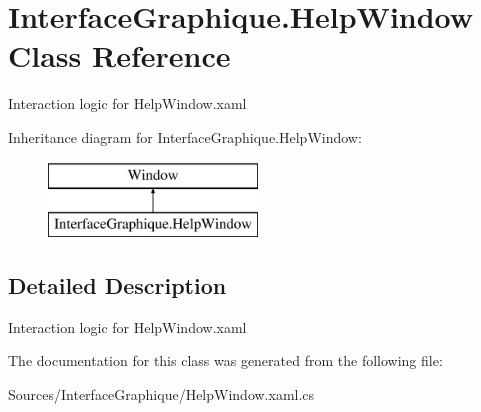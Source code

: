 \hypertarget{class_interface_graphique_1_1_help_window}{}\section{Interface\+Graphique.\+Help\+Window Class Reference}
\label{class_interface_graphique_1_1_help_window}


Interaction logic for Help\+Window.\+xaml  


Inheritance diagram for Interface\+Graphique.\+Help\+Window\+:\begin{figure}[H]
\begin{center}
\leavevmode
\includegraphics[height=2.000000cm]{class_interface_graphique_1_1_help_window}
\end{center}
\end{figure}


\subsection{Detailed Description}
Interaction logic for Help\+Window.\+xaml 



The documentation for this class was generated from the following file\+:\begin{DoxyCompactItemize}
\item 
Sources/\+Interface\+Graphique/Help\+Window.\+xaml.\+cs\end{DoxyCompactItemize}
